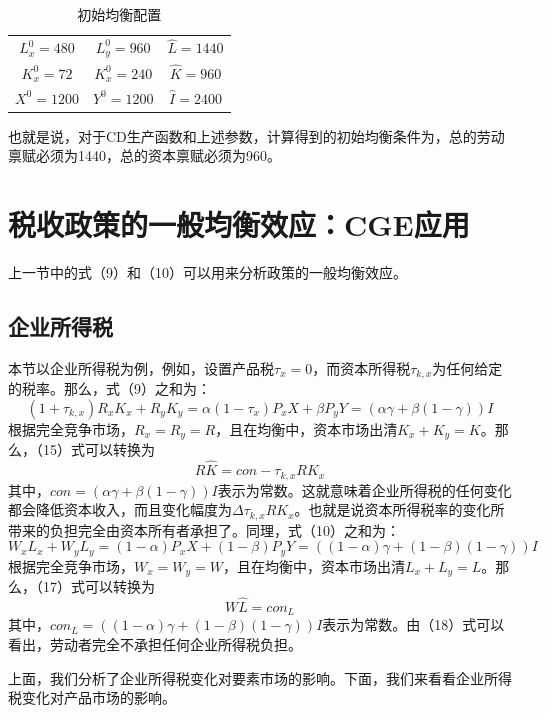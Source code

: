 \documentclass[cn,12pt,math=newtx,citestyle=gb7714-2015,bibstyle=gb7714-2015]{elegantbook}
\begin{document}
	\begin{table}[!htbp]
		\centering
		\caption{初始均衡配置}
		\begin{tabular}{ccc}
			\hline
			$L^0_x=480$& $L^0_y=960$ & $\hat{L}=1440$ \\
			$K^0_x=72$& $K^0_x=240$ &$\hat{K}=960$  \\
			$X^0=1200$& $Y^0=1200$ & $\hat{I}=2400$ \\
			\hline
		\end{tabular}
	\end{table}
	
	也就是说，对于CD生产函数和上述参数，计算得到的初始均衡条件为，总的劳动禀赋必须为1440，总的资本禀赋必须为960。
	
	
	\section{税收政策的一般均衡效应：CGE应用}
	上一节中的式（9）和（10）可以用来分析政策的一般均衡效应。
	\subsection{企业所得税}
	本节以企业所得税为例，例如，设置产品税$\tau_x=0$，而资本所得税$\tau_{k,x}$为任何给定的税率。那么，式（9）之和为：
	\begin{equation}
		(1+\tau_{k,x})R_xK_x+R_yK_y=\alpha(1-\tau_x)P_xX+\beta P_yY=(\alpha \gamma +\beta (1-\gamma)) I
	\end{equation}
	根据完全竞争市场，$R_x=R_y=R$，且在均衡中，资本市场出清$K_x+K_y=K$。那么，（15）式可以转换为
	\begin{equation}
		R\hat{K}=con-\tau_{k,x}RK_x
	\end{equation}
	其中，$con=(\alpha \gamma +\beta (1-\gamma)) I$表示为常数。这就意味着企业所得税的任何变化都会降低资本收入，而且变化幅度为$\Delta\tau_{k,x}RK_x$。也就是说资本所得税率的变化所带来的负担完全由资本所有者承担了。同理，式（10）之和为：
	\begin{equation}
		W_xL_x+W_yL_y=(1-\alpha)P_xX+(1-\beta) P_yY=((1-\alpha)\gamma +(1-\beta)(1-\gamma)) I
	\end{equation}
	根据完全竞争市场，$W_x=W_y=W$，且在均衡中，资本市场出清$L_x+L_y=L$。那么，（17）式可以转换为
	\begin{equation}
		W\hat{L}=con_L
	\end{equation}
	其中，$con_L=((1-\alpha)\gamma +(1-\beta)(1-\gamma)) I$表示为常数。由（18）式可以看出，劳动者完全不承担任何企业所得税负担。
	
	上面，我们分析了企业所得税变化对要素市场的影响。下面，我们来看看企业所得税变化对产品市场的影响。
	
\end{document}
